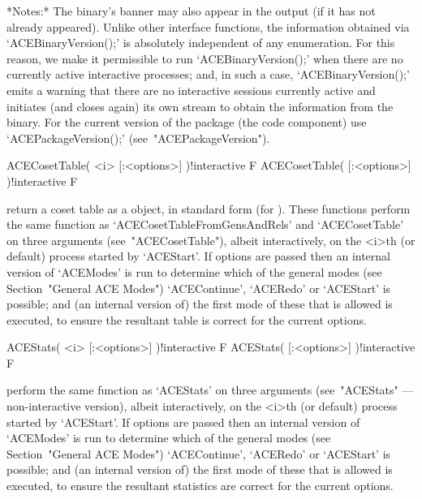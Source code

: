 \endexample

*Notes:*
The {\ACE} binary's banner may also appear in the output  (if  it  has
not already appeared). Unlike other {\ACE}  interface  functions,  the
information   obtained   via   `ACEBinaryVersion();'   is   absolutely
independent  of  any  enumeration.  For  this  reason,  we   make   it
permissible to run `ACEBinaryVersion();' when there are  no  currently
active  interactive  {\ACE}  processes;   and,   in   such   a   case,
`ACEBinaryVersion();' emits a warning that there  are  no  interactive
{\ACE} sessions currently active and initiates (and closes again)  its
own stream to obtain the information from the {\ACE} binary.  For  the
current version of the {\ACE} package (the {\GAP} code component)  use
`ACEPackageVersion();' (see~"ACEPackageVersion").


\>ACECosetTable( <i> [:<options>] )!{interactive} F
\>ACECosetTable( [:<options>] )!{interactive} F

return a coset table  as  a  {\GAP}  object,  in  standard  form  (for
{\GAP}).   These   functions   perform   the    same    function    as
`ACECosetTableFromGensAndRels' and `ACECosetTable' on three  arguments
(see~"ACECosetTable"), albeit interactively, on the <i>th (or default)
process started by `ACEStart'. If options are passed then an  internal
version of `ACEModes' is run to determine which of the general  {\ACE}
modes (see Section~"General ACE Modes")  `ACEContinue',  `ACERedo'  or
`ACEStart' is possible; and (an internal version of) the first mode of
these that is allowed is executed, to ensure the  resultant  table  is
correct for the current options.

\>ACEStats( <i> [:<options>] )!{interactive} F
\>ACEStats( [:<options>] )!{interactive} F

perform  the  same  function  as   `ACEStats'   on   three   arguments
(see~"ACEStats" --- non-interactive version), albeit interactively, on
the <i>th (or default) process started by `ACEStart'. If  options  are
passed then an internal version of  `ACEModes'  is  run  to  determine
which of the general {\ACE} modes (see  Section~"General  ACE  Modes")
`ACEContinue', `ACERedo' or `ACEStart' is possible; and  (an  internal
version of) the first mode of these that is allowed  is  executed,  to
ensure the resultant statistics are correct for the current options.


